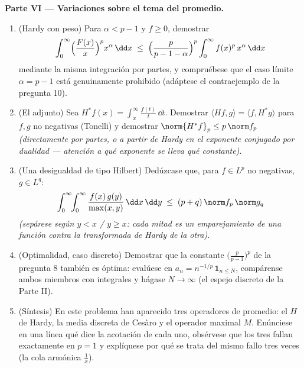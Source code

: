 \begin{problem}
\medskip
\noindent\textbf{Parte VI --- Variaciones sobre el tema del promedio.}
\begin{enumerate}[resume]
  \item (Hardy con peso) Para $\alpha < p - 1$ y $f \geq 0$, demostrar
        \[
        \int_0^\infty\Bigl(\frac{F(x)}x\Bigr)^{p}
        x^{\alpha}\,\dd x \;\leq\;
        \Bigl(\frac{p}{p - 1 - \alpha}\Bigr)^{p}
        \int_0^\infty f(x)^p\,x^{\alpha}\,\dd x
        \]
        mediante la misma integración por partes, y compruébese que el
        caso límite $\alpha = p - 1$ está genuinamente prohibido
        (adáptese el contraejemplo de la pregunta 10). \item (El
        adjunto) Sea $H^*f(x) =
        \int_x^{\infty}\frac{f(t)}t\,\dd t$. Demostrar $\langle
        Hf, g\rangle = \langle f, H^*g\rangle$ para $f, g$ no negativas
        (Tonelli) y demostrar $\norm{H^*f}_p \leq p\,\norm f_p$
        \emph{(directamente por partes, o a partir de Hardy en el
        exponente conjugado por dualidad --- atención a qué exponente se
        lleva qué constante)}. \item (Una desigualdad de tipo Hilbert)
        Dedúzcase que, para $f \in L^p$ no negativas, $g \in L^q$:
        \[
        \int_0^\infty\!\!\int_0^\infty
        \frac{f(x)\,g(y)}{\max(x,y)}\,\dd x\,\dd y
        \;\leq\; (p + q)\,\norm f_p\,\norm g_q
        \]
        \emph{(sepárese según $y < x$ / $y \geq x$: cada mitad es un
        emparejamiento de una función contra la transformada de Hardy de
        la otra)}. \item (Optimalidad, caso discreto) Demostrar que la
        constante $\bigl(\frac p{p-1}\bigr)^p$ de la pregunta 8 también
        es óptima: evalúese en $a_n = n^{-1/p}\,\mathbf 1_{n \leq
        N}$, compárense ambos miembros con integrales y hágase $N
        \to \infty$ (el espejo discreto de la Parte II). \item
        (Síntesis) En este problema han aparecido tres operadores de
        promedio: el $H$ de Hardy, la media discreta de Cesàro y el
        operador maximal $M$. Enúnciese en una línea qué dice la
        acotación de cada uno, obsérvese que los tres fallan exactamente
        en $p = 1$ y explíquese por qué se trata del mismo fallo tres
        veces (la cola armónica
        $\frac1x$).
\end{enumerate}


\end{problem}
